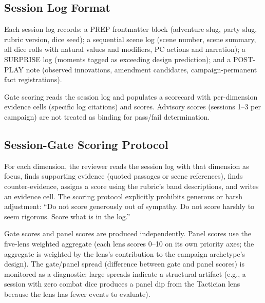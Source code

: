 \subsection{Session Log Format}

Each session log records: a PREP frontmatter block (adventure slug, party slug, rubric
version, dice seed); a sequential scene log (scene number, scene summary, all dice
rolls with natural values and modifiers, PC actions and narration); a SURPRISE log
(moments tagged as exceeding design prediction); and a POST-PLAY note (observed
innovations, amendment candidates, campaign-permanent fact registrations).

Gate scoring reads the session log and populates a scorecard with per-dimension
evidence cells (specific log citations) and scores. Advisory scores (sessions 1--3 per
campaign) are not treated as binding for pass/fail determination.

\subsection{Session-Gate Scoring Protocol}

For each dimension, the reviewer reads the session log with that dimension as focus,
finds supporting evidence (quoted passages or scene references), finds counter-evidence,
assigns a score using the rubric's band descriptions, and writes an evidence cell.
The scoring protocol explicitly prohibits generous or harsh adjustment: ``Do not score
generously out of sympathy. Do not score harshly to seem rigorous. Score what is in
the log.''

Gate scores and panel scores are produced independently. Panel scores use the five-lens
weighted aggregate (each lens scores 0--10 on its own priority axes; the aggregate is
weighted by the lens's contribution to the campaign archetype's design). The gate/panel
spread (difference between gate and panel scores) is monitored as a diagnostic: large
spreads indicate a structural artifact (e.g., a session with zero combat dice produces a
panel dip from the Tactician lens because the lens has fewer events to evaluate).
